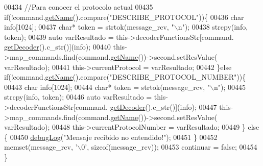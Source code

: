\begin{DoxyCode}
{{{{{{{{{{{{{00434                             \textcolor{comment}{//Para conocer el protocolo actual}
00435                             \textcolor{keywordflow}{if}(!command.\hyperlink{classCommands_adf3d8a96310b1f4e57a6ecf0f2f153ea}{getName}().compare(\textcolor{stringliteral}{"DESCRIBE\_PROTOCOL"}))\{
00436                                 \textcolor{keywordtype}{char} info[1024];
00437                                 \textcolor{keywordtype}{char}* token = strtok(message\_rcv, \textcolor{stringliteral}{"\(\backslash\)n"});
00438                                 strcpy(info, token);
00439                                 \textcolor{keyword}{auto} varResultado = this->decoderFunctionsStr[command.
      \hyperlink{classCommands_a8b4c2a655d8dd3de334338d6684d469c}{getDecoder}().c\_str()](info);
00440                                 this->map\_commands.find(command.\hyperlink{classCommands_adf3d8a96310b1f4e57a6ecf0f2f153ea}{getName}())->second.setResValue(
      varResultado);
00441                                 this->currentProtocol = varResultado;
00442                             \}\textcolor{keywordflow}{else} \textcolor{keywordflow}{if}(!command.\hyperlink{classCommands_adf3d8a96310b1f4e57a6ecf0f2f153ea}{getName}().compare(\textcolor{stringliteral}{"DESCRIBE\_PROTOCOL\_NUMBER"}))\{
00443                                 \textcolor{keywordtype}{char} info[1024];
00444                                 \textcolor{keywordtype}{char}* token = strtok(message\_rcv, \textcolor{stringliteral}{"\(\backslash\)n"});
00445                                 strcpy(info, token);
00446                                 \textcolor{keyword}{auto} varResultado = this->decoderFunctionsStr[command.
      \hyperlink{classCommands_a8b4c2a655d8dd3de334338d6684d469c}{getDecoder}().c\_str()](info);
00447                                 this->map\_commands.find(command.\hyperlink{classCommands_adf3d8a96310b1f4e57a6ecf0f2f153ea}{getName}())->second.setResValue(
      varResultado);
00448                                 this->currentProtocolNumber = varResultado;
00449                             \} \textcolor{keywordflow}{else} \{
00450                                 \hyperlink{debug_8hpp_a55f41cf7b0585224496de3d7adbc101c}{debugLog}(\textcolor{stringliteral}{"Mensaje recibido no entendido!"});
00451                             \}
00452                             memset(message\_rcv, \textcolor{charliteral}{'\(\backslash\)0'}, \textcolor{keyword}{sizeof}(message\_rcv));                         
00453                             continuar = \textcolor{keyword}{false};
00454                         \}
}}}}}}}}}}}}}
\end{DoxyCode}
